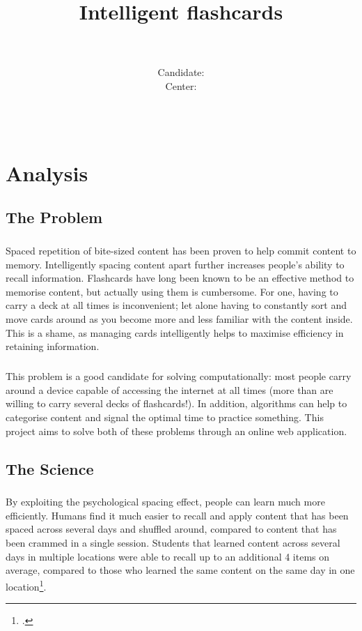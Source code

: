 \documentclass{report}
\title{Intelligent flashcards}
\author {
  \candidatename \\\\
  Candidate: \candidatenumber \\
  Center: \centernumber \\
  \centername \\\\
  \qualification
}
\begin{document}
\raggedbottom
\maketitle
\setcounter{page}{2}
\tableofcontents

\chapter{Analysis}
\section{The Problem}
\paragraph{}
Spaced repetition of bite-sized content has been proven to help commit content to memory. Intelligently spacing content apart further increases people's ability to recall information. Flashcards have long been known to be an effective method to memorise content, but actually using them is cumbersome. For one, having to carry a deck at all times is inconvenient; let alone having to constantly sort and move cards around as you become more and less familiar with the content inside. This is a shame, as managing cards intelligently helps to maximise efficiency in retaining information. 

\paragraph{}
This problem is a good candidate for solving computationally: most people carry around a device capable of accessing the internet at all times (more than are willing to carry several decks of flashcards!). In addition, algorithms can help to categorise content and signal the optimal time to practice something. This project aims to solve both of these problems through an online web application.

\section{The Science}
\paragraph{}
By exploiting the psychological spacing effect, people can learn much more efficiently. Humans find it much easier to recall and apply content that has been spaced across several days and shuffled around, compared to content that has been crammed in a single session. Students that learned content across several days in multiple locations were able to recall up to an additional 4 items on average, compared to those who learned the same content on the same day in one location\footcite{ShufflingMathematicsProblems}.
\end{document}
